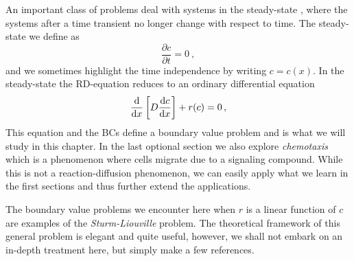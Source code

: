 
An important class of problems deal with systems in the steady-state , where the
systems after a time transient no longer change with respect to time. The steady-state we define as  
\begin{equation}
  \frac{\partial c}{\partial t}=0 \ ,
\end{equation}
and we sometimes highlight the time independence by writing $c=c(x)$. In the steady-state  
the RD-equation reduces to an ordinary differential equation
\begin{equation}
	\frac{\mathrm{d}}{\mathrm{d} x} \left[ D \frac{\mathrm{d} c}{\mathrm{d} x}\right] + r(c)=0 \, ,  
\end{equation}
This equation and the BCs define a boundary value 
problem and is what we will study in this chapter. In the last optional section we 
also explore \emph{chemotaxis} which is a phenomenon where cells migrate due to a 
signaling compound. While this is not a reaction-diffusion phenomenon, we can 
easily apply what we learn in the first sections and thus further extend the applications.

The boundary value problems we encounter here when $r$ is a linear function of $c$ 
are examples of the \emph{Sturm-Liouville}  problem. The theoretical 
framework of this general problem is elegant and quite useful, however, we shall 
not embark on an in-depth treatment here, but simply make a few references. 


